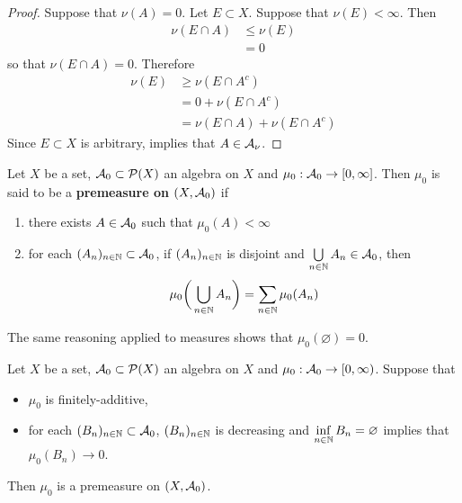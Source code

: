 \documentclass{book}
\begin{document}
	\begin{proof}
		Suppose that $\nu(A) = 0$. Let $E \subset X$. Suppose that $\nu(E) < \infty$. Then 
		\begin{align*}
			\nu(E \cap A) 
			& \leq \nu(E) \\
			& = 0
		\end{align*}
		so that $\nu(E \cap A) = 0$. Therefore
		\begin{align*}
			\nu(E)
			& \geq \nu(E \cap A^c) \\
			& = 0 + \nu(E \cap A^c) \\
			& = \nu(E \cap A) + \nu(E \cap A^c) 
		\end{align*}
		Since $E \subset X$ is arbitrary,  implies that $A \in \mathcal{A}_{\nu}$.
	\end{proof}
	
	\begin{defn}  
		Let $X$ be a set, $\mathcal{A}_0 \subset \mathcal{P}(X)$ an algebra on $X$ and $\mu_0:\mathcal{A}_0 \rightarrow [0, \infty]$. Then $\mu_0$ is said to be a \textbf{premeasure on $(X,\mathcal{A}_0)$} if 
		\begin{enumerate}
			\item there exists $A \in \mathcal{A}_0$ such that $\mu_0(A)< \infty$
			\item for each $(A_n)_{n \in \mathbb{N}} \subset \mathcal{A}_0$, if $(A_n)_{n \in \mathbb{N}}$ is disjoint and $\bigcup\limits_{n \in \mathbb{N}}A_n \in \mathcal{A}_0$, then $$\mu_0 \bigg(\bigcup_{n\in \mathbb{N}}A_n \bigg) = \sum\limits_{n \in \mathbb{N}}\mu_0(A_n)$$
		\end{enumerate}
	\end{defn}
	
	\begin{note}
		The same reasoning applied to measures shows that $\mu_0(\varnothing) = 0$.
	\end{note}

	\begin{ex} 
		Let $X$ be a set, $\mathcal{A}_0 \subset \mathcal{P}(X)$ an algebra on $X$ and $\mu_0:\mathcal{A}_0 \rightarrow [0,\infty)$. Suppose that
		\begin{itemize}
			\item $\mu_0$ is finitely-additive,
			\item for each $(B_n)_{n \in \mathbb{N}} \subset \mathcal{A}_0$, $(B_n)_{n \in \mathbb{N}} $ is decreasing and $\inf\limits_{n \in \mathbb{N}} B_n = \varnothing$ implies that $\mu_0(B_n) \rightarrow 0$.
		\end{itemize}  
		Then $\mu_0$ is a premeasure on $(X, \mathcal{A}_0)$.
	\end{ex}
	
\end{document}
